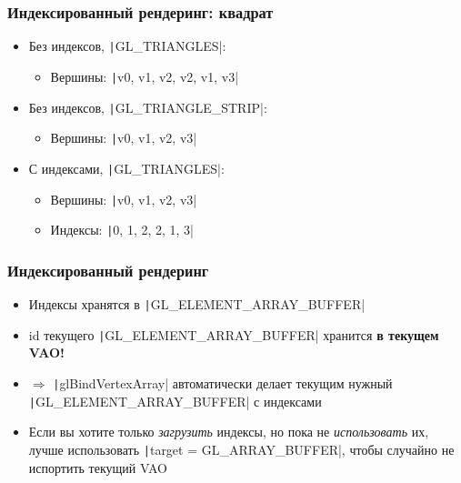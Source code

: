 \documentclass[10pt]{beamer}
\begin{document}
\begin{frame}[fragile]
\frametitle{Индексированный рендеринг: квадрат}
\begin{center}
\end{center}
\pause
\begin{itemize}
\item Без индексов, \texttt|GL_TRIANGLES|:
\begin{itemize}
\item Вершины: \texttt|v0, v1, v2, v2, v1, v3|
\end{itemize}
\pause
\item Без индексов, \texttt|GL_TRIANGLE_STRIP|:
\begin{itemize}
\item Вершины: \texttt|v0, v1, v2, v3|
\end{itemize}
\pause
\item С индексами, \texttt|GL_TRIANGLES|:
\begin{itemize}
\item Вершины: \texttt|v0, v1, v2, v3|
\item Индексы: \texttt|0, 1, 2, 2, 1, 3|
\end{itemize}
\end{itemize}
\end{frame}

\begin{frame}[fragile]
\frametitle{Индексированный рендеринг}
\begin{itemize}
\item Индексы хранятся в \texttt|GL_ELEMENT_ARRAY_BUFFER|
\pause
\item id текущего \texttt|GL_ELEMENT_ARRAY_BUFFER| хранится \alert{\textbf{в текущем VAO!}}
\pause
\item \begin{math}\Longrightarrow\end{math} \texttt|glBindVertexArray| автоматически делает текущим нужный \texttt|GL_ELEMENT_ARRAY_BUFFER| с индексами
\pause
\item Если вы хотите только \textit{загрузить} индексы, но пока не \textit{использовать} их, лучше использовать \texttt|target = GL_ARRAY_BUFFER|, чтобы случайно не испортить текущий VAO
\end{itemize}
\end{frame}
\end{document}
